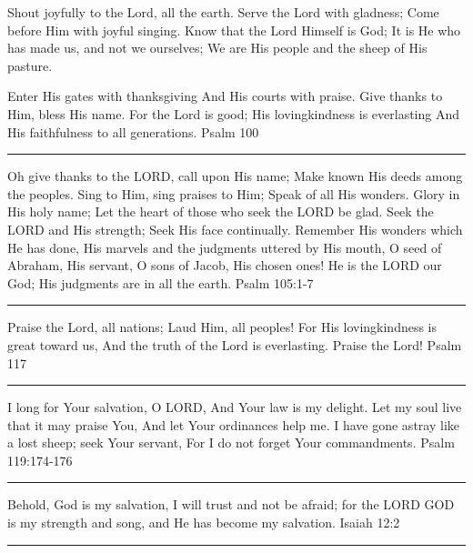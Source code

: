 \documentclass[]{book}
\begin{document}
Shout joyfully to the Lord, all the earth. Serve the Lord with gladness;
Come before Him with joyful singing. Know that the Lord Himself is God;
It is He who has made us, and not we ourselves; We are His people and
the sheep of His pasture.

Enter His gates with thanksgiving And His courts with praise. Give
thanks to Him, bless His name. For the Lord is good; His lovingkindness
is everlasting And His faithfulness to all generations. \textbar{} Psalm
100

\begin{center}\rule{0.5\linewidth}{\linethickness}\end{center}

Oh give thanks to the LORD, call upon His name; Make known His deeds
among the peoples. Sing to Him, sing praises to Him; Speak of all His
wonders. Glory in His holy name; Let the heart of those who seek the
LORD be glad. Seek the LORD and His strength; Seek His face continually.
Remember His wonders which He has done, His marvels and the judgments
uttered by His mouth, O seed of Abraham, His servant, O sons of Jacob,
His chosen ones! He is the LORD our God; His judgments are in all the
earth. \textbar{} Psalm 105:1-7

\begin{center}\rule{0.5\linewidth}{\linethickness}\end{center}

Praise the Lord, all nations; Laud Him, all peoples! For His
lovingkindness is great toward us, And the truth of the Lord is
everlasting. Praise the Lord! \textbar{} Psalm 117

\begin{center}\rule{0.5\linewidth}{\linethickness}\end{center}

I long for Your salvation, O LORD, And Your law is my delight. Let my
soul live that it may praise You, And let Your ordinances help me. I
have gone astray like a lost sheep; seek Your servant, For I do not
forget Your commandments. \textbar{} Psalm 119:174-176

\begin{center}\rule{0.5\linewidth}{\linethickness}\end{center}

Behold, God is my salvation, I will trust and not be afraid; for the
LORD GOD is my strength and song, and He has become my salvation.
\textbar{} Isaiah 12:2

\begin{center}\rule{0.5\linewidth}{\linethickness}\end{center}
\end{document}
